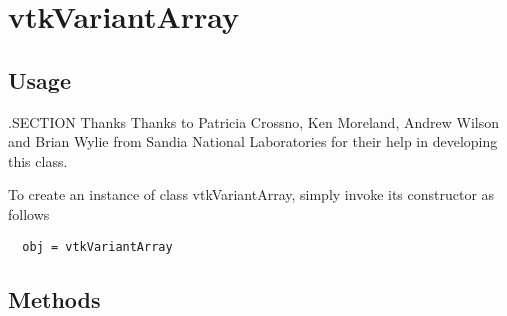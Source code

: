 \section{vtkVariantArray}

\subsection{Usage}


 .SECTION Thanks
 Thanks to Patricia Crossno, Ken Moreland, Andrew Wilson and Brian Wylie from
 Sandia National Laboratories for their help in developing this class.

To create an instance of class vtkVariantArray, simply
invoke its constructor as follows
\begin{verbatim}
  obj = vtkVariantArray
\end{verbatim}
\subsection{Methods}

